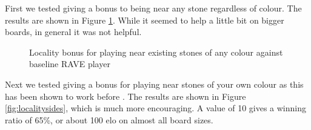 First we tested giving a bonus to being near any stone regardless of colour. The results are shown in Figure \ref{fig:localityany}. While it seemed to help a little bit on bigger boards, in general it was not helpful.

\begin{figure}
	\centering
{}
	\caption{Locality bonus for playing near existing stones of any colour against baseline RAVE player}
	\label{fig:localityany}
\end{figure}

Next we tested giving a bonus for playing near stones of your own colour as this has been shown to work before \cite{lorentz2011improving, stankiewicz2011knowledge}. The results are shown in Figure \ref{fig:localitysides}, which is much more encouraging. A value of 10 gives a winning ratio of 65\%, or about 100 elo on almost all board sizes.

